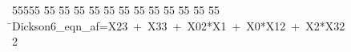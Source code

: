 %
%
\begin{tabbing}
55555 \= 55 \= 55 \= 55 \= 55 \= 55 \= 55 \= 55 \= 55 \= 55 \= 55 \= 55 \= 55 \= \>Dickson6\_eqn\_af=X23\ +\ X33\ +\ X02*X1\ +\ X0*X12\ +\ X2*X32\\[0pt]
2\>\end{tabbing}
